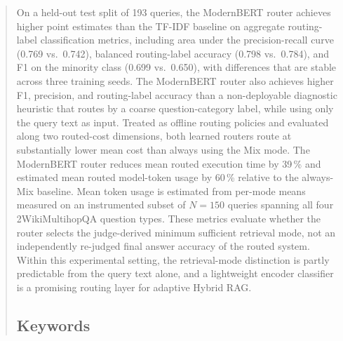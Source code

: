 \documentclass[english, bibtex]{kththesis}               %
\numberwithin{listing}{chapter}
\begin{document}
\begin{abstract}
\begin{scontents}[store-env=abstracts,print-env=true]
On a held-out test split of 193 queries, the ModernBERT router achieves higher point estimates than the TF-IDF baseline on aggregate routing-label classification metrics, including area under the precision-recall curve (0.769 vs.\ 0.742), balanced routing-label accuracy (0.798 vs.\ 0.784), and F1 on the minority class (0.699 vs.\ 0.650), with differences that are stable across three training seeds. The ModernBERT router also achieves higher F1, precision, and routing-label accuracy than a non-deployable diagnostic heuristic that routes by a coarse question-category label, while using only the query text as input. Treated as offline routing policies and evaluated along two routed-cost dimensions, both learned routers route at substantially lower mean cost than always using the Mix mode. The ModernBERT router reduces mean routed execution time by 39\,\% and estimated mean routed model-token usage by 60\,\% relative to the always-Mix baseline. Mean token usage is estimated from per-mode means measured on an instrumented subset of \(N = 150\) queries spanning all four 2WikiMultihopQA question types. These metrics evaluate whether the router selects the judge-derived minimum sufficient retrieval mode, not an independently re-judged final answer accuracy of the routed system. Within this experimental setting, the retrieval-mode distinction is partly predictable from the query text alone, and a lightweight encoder classifier is a promising routing layer for adaptive Hybrid RAG.
\end{scontents}

\subsection*{Keywords}
\begin{scontents}[store-env=keywords,print-env=true]
\end{scontents}
\end{abstract}
\cleardoublepage
{}
\end{document}
